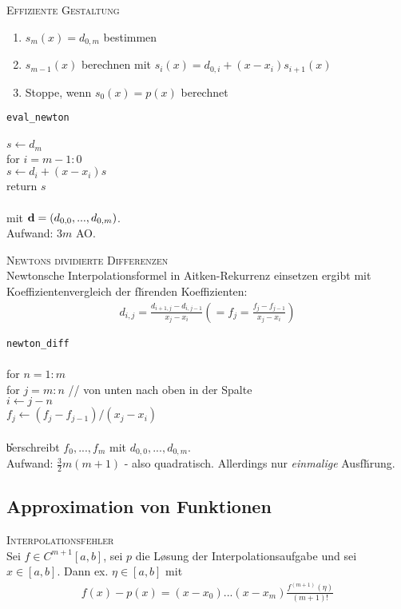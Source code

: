\textsc{Effiziente Gestaltung}\\
\begin{enumerate}
\item $s_m(x)=d_{0,m}$ bestimmen
\item $s_{m-1}(x)$ berechnen mit $s_i(x)=d_{0,i}+(x-x_i)s_{i+1}(x)$
\item Stoppe, wenn $s_0(x)=p(x)$ berechnet
\end{enumerate}

\verb!eval_newton!\\
{\addtolength{\leftskip}{0mm}
\hrulefill\\
$s \leftarrow d_m$ \\
for $i=m-1:0$ \\
\quad $s \leftarrow d_i+(x-x_i)s$ \\
return $s$  \\
\hrulefill\\
}
mit $\mbox{\bf d}=(d_{0,0},...,d_{0,m})$.\\
Aufwand: $3m$ AO. \vspace{0.2cm}

\textsc{Newtons dividierte Differenzen}\\
Newtonsche Interpolationsformel in Aitken-Rekurrenz einsetzen ergibt mit Koeffizientenvergleich der f\u hrenden Koeffizienten:
\begin{align*}
d_{i,j}=\frac{d_{i+1,j}-d_{i,j-1}}{x_j-x_i} \left(=f_j = \frac{f_j-f_{j-1}}{x_j-x_i}\right)
\end{align*}

\verb!newton_diff!\\
{\addtolength{\leftskip}{0mm}
\hrulefill\\
for $n=1:m$ \\
\quad for $j=m:n$ {\scriptsize // von unten nach oben in der Spalte} \\
\qquad $i \leftarrow j-n$\\
\qquad $f_j \leftarrow (f_j-f_{j-1})/(x_j-x_i)$\\
\hrulefill\\
}
\U berschreibt $f_0,...,f_m$ mit $d_{0,0},...,d_{0,m}$.\\
Aufwand: $\frac{3}{2}m(m+1)$ - also quadratisch. Allerdings nur \emph{einmalige} Ausf\u hrung.

\subsection{Approximation von Funktionen}
\textsc{Interpolationsfehler}\\
Sei $f\in C^{m+1}[a,b]$, sei $p$ die L\o sung der Interpolationsaufgabe und sei $x\in [a,b]$. Dann ex. $\eta \in [a,b]$ mit
\begin{align*}
f(x)-p(x) = (x-x_0)...(x-x_m)\frac{f^{(m+1)}(\eta)}{(m+1)!}
\end{align*}

